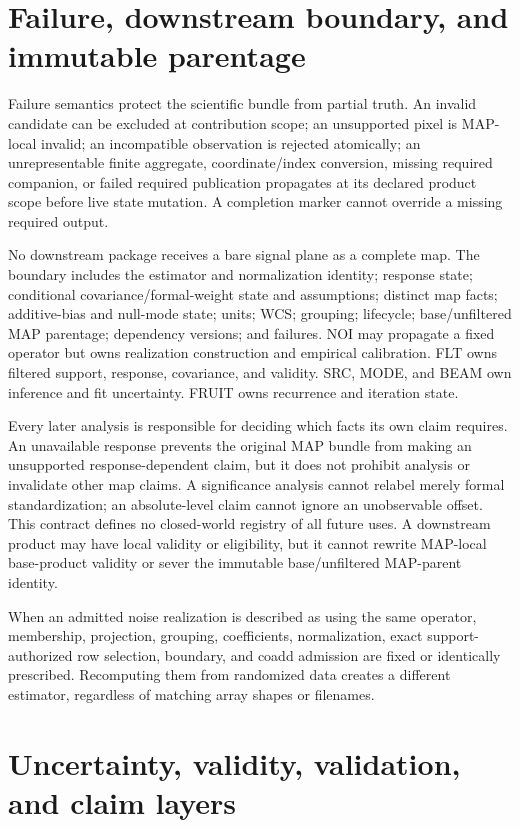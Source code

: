\documentclass[10pt]{article}
\begin{document}
\clearpage
\section{Failure, downstream boundary, and immutable parentage}

Failure semantics protect the scientific bundle from partial truth. An
invalid candidate can be excluded at contribution scope; an unsupported pixel
is MAP-local invalid; an incompatible observation is rejected atomically; an
unrepresentable finite aggregate, coordinate/index conversion, missing
required companion, or failed required publication propagates at its declared
product scope before live state mutation. A completion marker cannot override
a missing required output.

No downstream package receives a bare signal plane as a complete map. The
boundary includes the estimator and normalization identity; response state;
conditional covariance/formal-weight state and assumptions; distinct map facts;
additive-bias and null-mode state; units; WCS; grouping; lifecycle;
base/unfiltered MAP parentage; dependency versions; and failures. NOI may propagate a fixed
operator but owns realization construction and empirical calibration. FLT
owns filtered support, response, covariance, and validity. SRC, MODE, and BEAM
own inference and fit uncertainty. FRUIT owns recurrence and iteration state.

Every later analysis is responsible for deciding which facts its own claim
requires. An unavailable response prevents the original MAP bundle from making
an unsupported response-dependent claim, but it does not prohibit analysis or
invalidate other map claims. A significance analysis cannot relabel merely
formal standardization; an absolute-level claim cannot ignore an unobservable
offset. This contract defines no closed-world registry of all future uses. A
downstream product may have local validity or eligibility, but it cannot
rewrite MAP-local base-product validity or sever the immutable base/unfiltered
MAP-parent identity.

When an admitted noise realization is described as using the same operator,
membership, projection, grouping, coefficients, normalization, exact
support-authorized row selection, boundary, and coadd admission are fixed or
identically prescribed. Recomputing them from randomized data creates a
different estimator, regardless of matching array shapes or filenames.

\clearpage
\section{Uncertainty, validity, validation, and claim layers}
\end{document}

